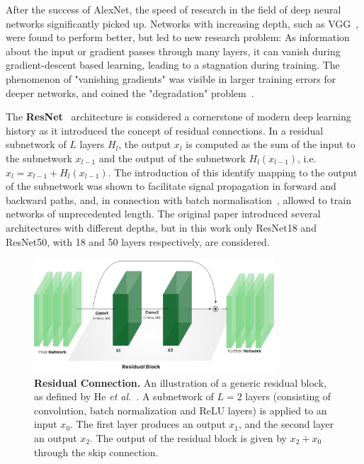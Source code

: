 \documentclass[a4paper]{article}
\begin{document}
After the success of AlexNet, the speed of research in the field of deep neural
networks significantly picked up. Networks with increasing depth, such as
VGG~\cite{vgg}, were found to perform better, but led to new research problem:
As information about the input or gradient passes through many layers, it can
vanish during gradient-descent based learning, leading to a stagnation during
training. The phenomenon of "vanishing gradients" was visible in larger training
errors for deeper networks, and coined the "degradation" problem~\cite{resnet}. 

The \textbf{ResNet}~\cite{resnet} architecture is considered a cornerstone of
modern deep learning history as it introduced the concept of residual
connections. In a residual subnetwork of $L$ layers $H_l$, the output $x_l$ is
computed as the sum of the input to the subnetwork $x_{l-1}$ and the output of
the subnetwork $H_l(x_{l-1})$, i.e. $x_l=x_{l-1}+H_l(x_{l-1})$. The introduction
of this identify mapping to the output of the subnetwork was shown to facilitate
signal propagation in forward and backward paths, and, in connection with batch
normalisation~\cite{batchnorm}, allowed to train networks of unprecedented
length. The original paper introduced several architectures with different
depths, but in this work only ResNet18 and ResNet50, with 18 and 50 layers
respectively, are considered.

\begin{figure}
  \centering
  \includegraphics[width=0.8\textwidth]{./figures/resnet.png}
  \caption{\textbf{Residual Connection.} An illustration of a generic residual
  block, as defined by He \textit{et al.}~\cite{resnet}. A subnetwork of $L=2$ layers
  (consisting of convolution, batch normalization and ReLU layers) is applied to
  an input $x_0$. The first layer produces an output $x_1$, and the second layer
  an output $x_2$. The output of the residual block is given by $x_2+x_0$
  through the skip connection.
  }
  \label{fig:residual-connection}
\end{figure}
\end{document}
